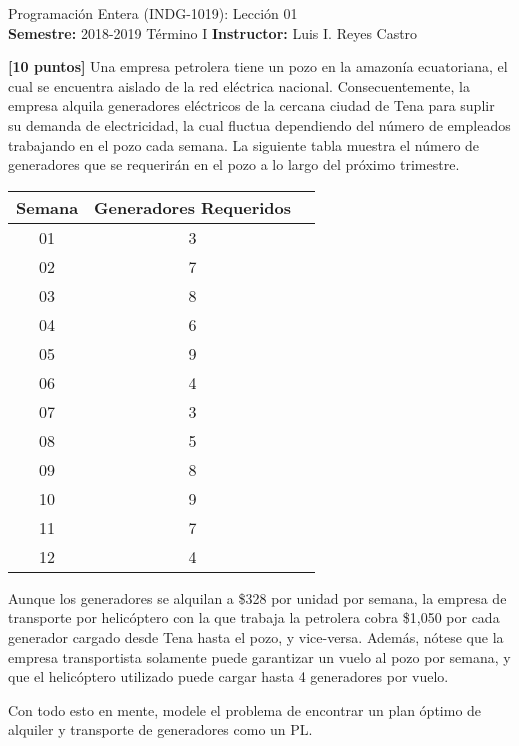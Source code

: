 \documentclass[ a4paper, twoside, 11pt]{article}
\newcommand{\numero}{01}
\begin{document}
\allowdisplaybreaks



\begin{center}
\Large Programaci\'on Entera (INDG-1019): Lecci\'on \numero \\[2ex]
\small \textbf{Semestre:} 2018-2019 T\'ermino I \qquad
\textbf{Instructor:} Luis I. Reyes Castro
\end{center}
\fullskip

\begin{problem}
\textbf{[10 puntos]} Una empresa petrolera tiene un pozo en la amazon\'ia ecuatoriana, el cual se encuentra aislado de la red el\'ectrica nacional. Consecuentemente, la empresa alquila generadores el\'ectricos de la cercana ciudad de Tena para suplir su demanda de electricidad, la cual fluctua dependiendo del n\'umero de empleados trabajando en el pozo cada semana. \linebreak La siguiente tabla muestra el n\'umero de generadores que se requerir\'an en el pozo a lo largo del pr\'oximo trimestre. 

\begin{table}[htb]
\centering
\label{tab:Problema_Generadores}
\begin{tabular}{|c|c|c|}
\hline
\textbf{Semana}	& \textbf{Generadores Requeridos} \\ \hline
01 & 3 \\ \hline
02 & 7 \\ \hline
03 & 8 \\ \hline
04 & 6 \\ \hline
05 & 9 \\ \hline
06 & 4 \\ \hline
07 & 3 \\ \hline
08 & 5 \\ \hline
09 & 8 \\ \hline
10 & 9 \\ \hline
11 & 7 \\ \hline
12 & 4 \\ \hline
\end{tabular}
\end{table}

Aunque los generadores se alquilan a \$328 por unidad por semana, la empresa de transporte por helic\'optero con la que trabaja la petrolera cobra \$1,050 por cada generador cargado desde Tena hasta el pozo, y vice-versa. Adem\'as, n\'otese que la empresa transportista solamente puede garantizar un vuelo al pozo por semana, y que el helic\'optero utilizado puede cargar hasta 4 generadores por vuelo. 

Con todo esto en mente, modele el problema de encontrar un plan \'optimo de alquiler y transporte de generadores como un PL. 

\end{problem}
\vspace{\baselineskip}
\end{document}
